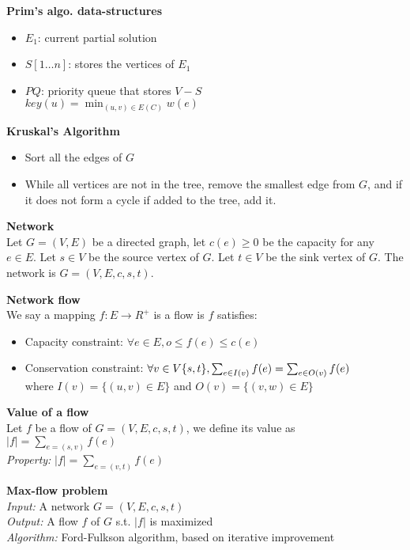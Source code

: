\documentclass[10pt,letterpaper,landscape]{report}
\newcommand{\boxheight}{21.59cm}
\newcommand{\boxwidth}{8.85cm}
\begin{document}
\begin{small}
{\begin{minipage}[t][\boxheight][c]{\boxwidth}
	\textbf{Prim's algo. data-structures}
	\begin{itemize}
	    \item $E_1$: current partial solution
	    \item $S[1\dots n]$: stores the vertices of $E_1$
	    \item $PQ$: priority queue that stores $V-S$\\
	    $key(u) = \min_{(u,v)\in E(C)} w(e)$
	\end{itemize}
	
	\textbf{Kruskal's Algorithm}
	\begin{itemize}
	    \item Sort all the edges of $G$
	    \item While all vertices are not in the tree, remove the smallest edge from $G$, and if it does not form a cycle if added to the tree, add it.
	\end{itemize}

    \textbf{Network}\\
    Let $G = (V,E)$ be a directed graph, let $c(e) \geq 0$ be the capacity for any $e\in E$. Let $s\in V$ be the source vertex of $G$. Let $t\in V$ be the sink vertex of $G$. The network is $G = (V,E,c,s,t)$.
    
    \textbf{Network flow}\\
    We say a mapping $f: E\rightarrow R^+$ is a flow is $f$ satisfies:
    \begin{itemize}
        \item Capacity constraint: $\forall e\in E, o \leq f(e) \leq c(e)$
        \item Conservation constraint: $\forall v\in V\\ \{s,t\}, \sum_{e\in I(v)} f(e) = \sum_{e\in O(v)} f(e)$\\
        where $I(v) = \{(u,v) \in E\}$ and $O(v) = \{(v,w) \in E\}$
    \end{itemize}
    
    \textbf{Value of a flow}\\
    Let $f$ be a flow of $G = (V,E,c,s,t)$, we define its value as $|f| = \sum_{e=(s,v)} f(e)$\\
    \textit{Property: } $|f| = \sum_{e=(v,t)} f(e)$
    
    \textbf{Max-flow problem}\\
    \textit{Input:} A network $G = (V,E,c,s,t)$\\
    \textit{Output: } A flow $f$ of $G$ s.t. $|f|$ is maximized\\
    \textit{Algorithm:} Ford-Fulkson algorithm, based on iterative improvement


\end{minipage}}
\end{small}
\end{document}
